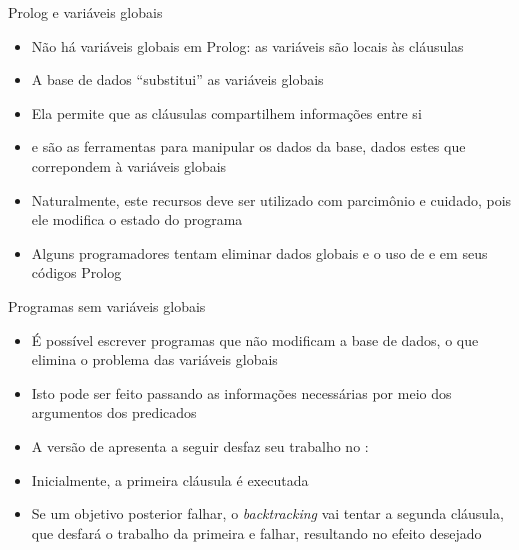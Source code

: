 \begin{frame}[fragile]{Prolog e variáveis globais}

    \begin{itemize}
        \item Não há variáveis globais em Prolog: as variáveis são locais às cláusulas

        \item A base de dados ``substitui'' as variáveis globais

        \item Ela permite que as cláusulas compartilhem informações entre si

        \item {} e  são as ferramentas para 
            manipular os dados da base, dados estes que correpondem à variáveis globais

        \item Naturalmente, este recursos deve ser utilizado com parcimônio e cuidado, pois 
            ele modifica o estado do programa

        \item Alguns programadores tentam eliminar dados globais e o uso de 
             e  em seus códigos Prolog
 
    \end{itemize}

\end{frame}

\begin{frame}[fragile]{Programas sem variáveis globais}

    \begin{itemize}

        \item É possível escrever programas que não modificam a base de dados, o que elimina o 
            problema das variáveis globais

        \item Isto pode ser feito passando as informações necessárias por meio dos argumentos 
            dos predicados

        \item A versão de  apresenta a seguir desfaz seu trabalho no 
            :


        \item Inicialmente, a primeira cláusula é executada

        \item Se um objetivo posterior falhar, o \textit{backtracking} vai tentar a segunda 
            cláusula, que desfará o trabalho da primeira e falhar, resultando no efeito 
            desejado

    \end{itemize}

\end{frame}
